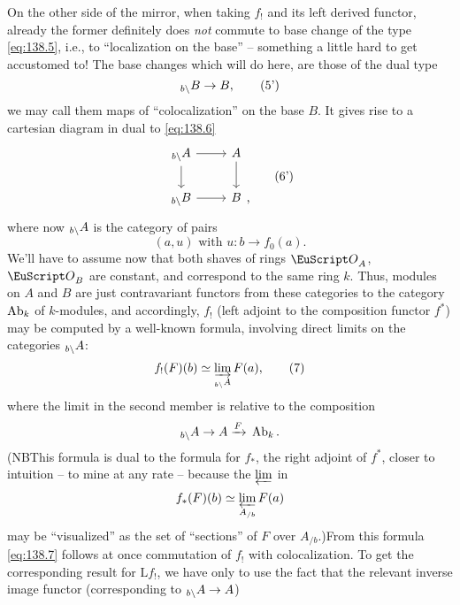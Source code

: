 On the other side of the mirror, when taking $f_!$ and its left
derived functor, already the former definitely does \emph{not} commute
to base change of the type \eqref{eq:138.5}, i.e., to ``localization
on the base'' -- something a little hard to get accustomed to! The
base changes which will do here, are those of the dual type
\begin{equation}
  \label{eq:138.5prime}
  \preslice Bb\to B,\tag{5'}
\end{equation}
we may call them maps of ``colocalization'' on the base $B$. It gives
rise to a cartesian diagram in \Cat{} dual to \eqref{eq:138.6}
\begin{equation}
  \label{eq:138.6prime}
  \begin{tabular}{@{}c@{}}
    \begin{tikzcd}[baseline=(O.base)]
      \preslice Ab\ar[d]\ar[r] & A\ar[d] \\
      \preslice Bb\ar[r] & |[alias=O]| B
    \end{tikzcd},
  \end{tabular}\tag{6'}
\end{equation}
where now $\preslice Ab$ is the category of pairs
\[\text{$(a,u)$ with $u:b\to f_0(a)$.}\]
We'll have to assume now that both shaves of rings $\scrO_A$,
$\scrO_B$ are constant, and correspond to the same ring $k$. Thus,
modules on $A$ and $B$ are just contravariant functors from these
categories to the category $\operatorname{Ab}_k$ of $k$-modules, and accordingly,
$f_!$ (left adjoint to the composition functor $f^*$) may be computed
by a well-known formula, involving direct limits on the categories
$\preslice Ab$:
\begin{equation}
  \label{eq:138.7}
  f_!(F)(b) \simeq\varinjlim_{\preslice Ab} F(a),\tag{7}
\end{equation}
where the limit in the second member is relative to the
composition
\[\preslice Ab\to A\xrightarrow F{} \AbOf_k.\]
(NB\enspace This formula is dual to the formula for $f_*$, the right
adjoint of $f^*$, closer to intuition -- to mine at any rate --
because the $\varprojlim$ in
\[f_*(F)(b) \simeq \varprojlim_{A_{/b}} F(a)\]
may be ``visualized'' as the set of ``sections'' of $F$ over
$A_{/b}$.)\enspace From this formula \eqref{eq:138.7} follows at once
commutation of $f_!$ with colocalization. To get the corresponding
result for $\mathrm Lf_!$, we have only to use the fact that the
relevant inverse image functor (corresponding to $\preslice Ab\to A$)
